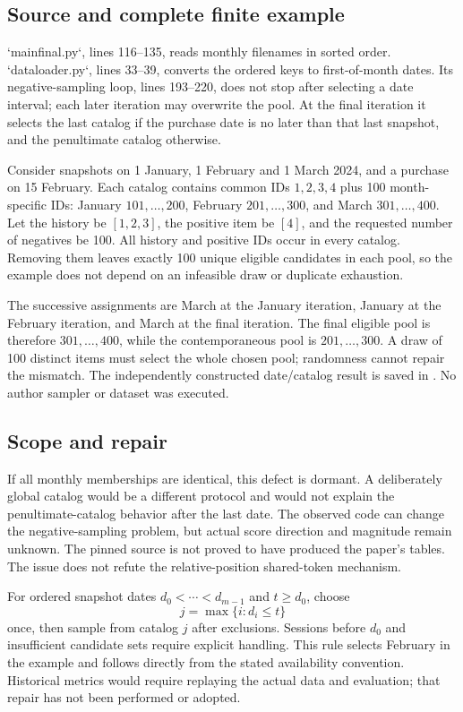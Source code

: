 \documentclass[10pt]{article}
\begin{document}
\subsection*{Source and complete finite example}
`mainfinal.py`, lines 116–135, reads monthly filenames in sorted order. `dataloader.py`, lines 33–39, converts the ordered keys to first-of-month dates. Its negative-sampling loop, lines 193–220, does not stop after selecting a date interval; each later iteration may overwrite the pool. At the final iteration it selects the last catalog if the purchase date is no later than that last snapshot, and the penultimate catalog otherwise.\par
Consider snapshots on 1 January, 1 February and 1 March 2024, and a purchase on 15 February. Each catalog contains common IDs \(1,2,3,4\) plus 100 month-specific IDs: January \(101,\ldots,200\), February \(201,\ldots,300\), and March \(301,\ldots,400\). Let the history be \([1,2,3]\), the positive item be \([4]\), and the requested number of negatives be 100. All history and positive IDs occur in every catalog. Removing them leaves exactly 100 unique eligible candidates in each pool, so the example does not depend on an infeasible draw or duplicate exhaustion.\par
The successive assignments are March at the January iteration, January at the February iteration, and March at the final iteration. The final eligible pool is therefore \(301,\ldots,400\), while the contemporaneous pool is \(201,\ldots,300\). A draw of 100 distinct items must select the whole chosen pool; randomness cannot repair the mismatch. The independently constructed date/catalog result is saved in . No author sampler or dataset was executed.\par
\subsection*{Scope and repair}
If all monthly memberships are identical, this defect is dormant. A deliberately global catalog would be a different protocol and would not explain the penultimate-catalog behavior after the last date. The observed code can change the negative-sampling problem, but actual score direction and magnitude remain unknown. The pinned source is not proved to have produced the paper’s tables. The issue does not refute the relative-position shared-token mechanism.\par
For ordered snapshot dates \(d_0<\cdots<d_{m-1}\) and \(t\geq d_0\), choose \[j=\max\{i:d_i\leq t\}\] once, then sample from catalog \(j\) after exclusions. Sessions before \(d_0\) and insufficient candidate sets require explicit handling. This rule selects February in the example and follows directly from the stated availability convention. Historical metrics would require replaying the actual data and evaluation; that repair has not been performed or adopted.\par
\end{document}
